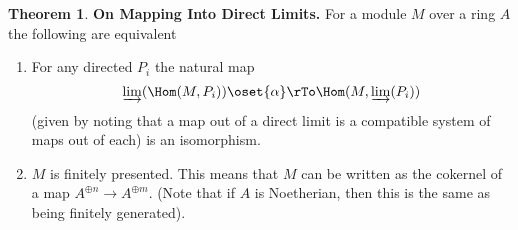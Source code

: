 \documentclass[12 pt]{article}
\theoremstyle{definition}
\newtheorem{theorem}{Theorem}[section]
\begin{document}
\begin{theorem} \textbf{On Mapping Into Direct Limits.} For a module $M$ over a ring $A$ the following are equivalent
\begin{enumerate}
\item  For any directed $P_i$ the natural map
\[\varinjlim(\Hom(M,P_i)) \oset{\alpha}\rTo \Hom(M, \varinjlim(P_i))\]
(given by noting that a map out of a direct limit is a compatible system of maps out of each) is an isomorphism.

\item $M$ is finitely presented. This means that $M$ can be written as the cokernel of a map $A^{\oplus n} \to A^{\oplus m}$. (Note that if $A$ is Noetherian, then this is the same as being finitely generated).

\end{enumerate}
\end{theorem}
\end{document}
